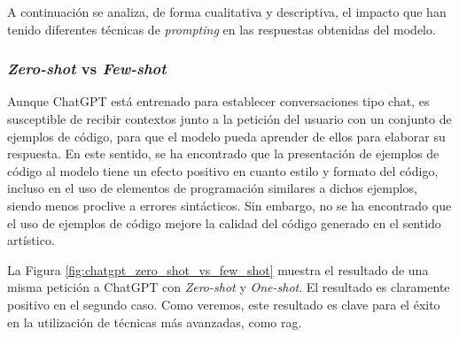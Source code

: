 A continuación se analiza, de forma cualitativa y descriptiva, el impacto que han tenido diferentes técnicas de \textit{prompting} en las respuestas obtenidas del modelo.

\subsubsection{\textit{Zero-shot} vs \textit{Few-shot}}

Aunque ChatGPT está entrenado para establecer conversaciones tipo chat, es susceptible de recibir contextos junto a la petición del usuario con un conjunto de ejemplos de código, para que el modelo pueda aprender de ellos para elaborar su respuesta. En este sentido, se ha encontrado que la presentación de ejemplos de código al modelo tiene un efecto positivo en cuanto estilo y formato del código, incluso en el uso de elementos de programación similares a dichos ejemplos, siendo menos proclive a errores sintácticos. Sin embargo, no se ha encontrado que el uso de ejemplos de código mejore la calidad del código generado en el sentido artístico. 

La Figura \ref{fig:chatgpt_zero_shot_vs_few_shot} muestra el resultado de una misma petición a ChatGPT con \textit{Zero-shot} y \textit{One-shot}. El resultado es claramente positivo en el segundo caso. Como veremos, este resultado es clave para el éxito en la utilización de técnicas más avanzadas, como \gls{rag}.


